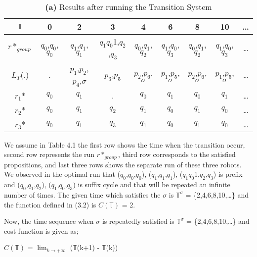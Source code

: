 \begin{table}[h]
\centering
\caption{\textbf{(a)} Results after running the Transition System} %
\addtolength{\tabcolsep}{-2pt}
\begin{tabular}{|c|c|c|c|c|c|c|c|c|} %
\hline %
$\mathbb{T}$ & 0 & 2 & 3 & 4 & 6 & 8 & 10 & \dots \\  [2ex] %
\hline %
$r*_{group}$ & $q_0$,$q_0$,$q_0$ & $q_1$,$q_1$,$q_1$ & $q_1$$q_0$1,$q_2$,$q_3$ & $q_0$,$q_1$,$q_2$ & $q_1$,$q_0$,$q_3$ & $q_0$,$q_1$,$q_2$ & $q_1$,$q_0$,$q_3$ & \dots \\ [2ex] %
$L_T$(.) & . & $p_1$,$p_2$,$p_4$,$\sigma$ & $p_3$,$p_5$ & $p_2$,$p_6$,$\sigma$ & $p_1$,$p_5$,$\sigma$ & $p_2$,$p_6$,$\sigma$ & $p_1$,$p_5$,$\sigma$ & \dots \\ [1.5ex]
$r_1$* & $q_0$ & $q_1$ & . & $q_0$ & $q_1$ & $q_0$ & $q_1$ & \dots \\ [2ex]
$r_2$* & $q_0$ & $q_1$ & $q_2$ & $q_1$ & $q_0$ & $q_1$ & $q_0$ & \dots \\ [2ex]
$r_3$* & $q_0$ & $q_1$ & $q_3$ & $q_1$ & $q_0$ & $q_1$ & $q_0$ & \dots \\ [2ex] %
\hline %
\end{tabular}
\label{table:nonlin} %
\end{table}

We assume in Table 4.1 the first row shows the time when the transition occur, second row represents the run $r*_{group}$, third row corresponds to the satisfied propositions, and last three rows shows the separate run of these three robots. We observed in the optimal run that ($q_0$,$q_0$,$q_0$), ($q_1$,$q_1$,$q_1$), ($q_1$$q_0$1,$q_2$,$q_3$) is prefix and ($q_0$,$q_1$,$q_2$), ($q_1$,$q_0$,$q_3$) is suffix cycle and that will be repeated an infinite number of times. The given time which satisfies the $\sigma$ is $\mathbb{T^\sigma}$ = \{2,4,6,8,10,\dots\} and the function defined in (3.2) is $C(\mathbb{T})$ = 2.

Now, the time sequence when $\sigma$ is repeatedly satisfied is $\mathbb{T^\sigma}$ = \{2,4,6,8,10,\dots\} and cost function is given as;

 \hspace{30pt}  $C(\mathbb{T})$ = $\lim_{k\to+\infty}$ ($\mathbb{T}$(k+1) - $\mathbb{T}$(k))

